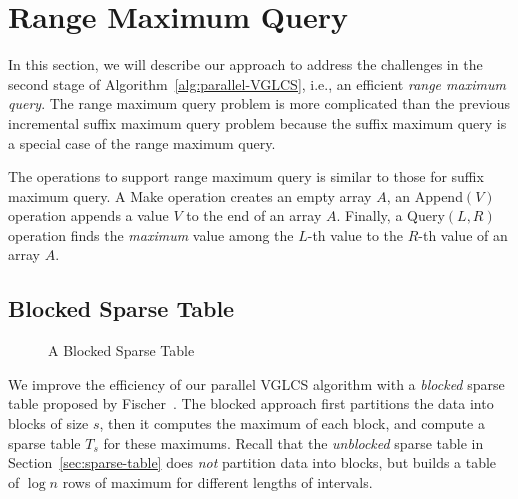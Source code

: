\section{Range Maximum Query} \label{sec:parallelRMQ}

In this section, we will describe our approach to address the
challenges in the second stage of Algorithm~\ref{alg:parallel-VGLCS},
i.e., an efficient {\em range maximum query}.  The range maximum query
problem is more complicated than the previous incremental suffix
maximum query problem because the suffix maximum query is a special
case of the range maximum query.

The operations to support range maximum query is similar to those for
suffix maximum query.  A {\sc Make} operation creates an empty array
$A$, an {\sc Append}$(V)$ operation appends a value $V$ to the end of an
array $A$.  Finally, a {\sc Query}$(L, R)$ operation finds the {\em
maximum} value among the $L$-th value to the $R$-th value of an array
$A$.


\subsection{Blocked Sparse Table} \label{sec:blocked-sparse-table}

\begin{figure}[!thb]
  \centering {} 
  \caption{A Blocked Sparse Table}
  \label{fig:block-interval-decomposition}
\end{figure}

We improve the efficiency of our parallel VGLCS algorithm with a {\em
  blocked} sparse table proposed by
Fischer~\cite{Fischer2006TheoreticalAP}.  The blocked approach first
partitions the data into blocks of size $s$, then it computes the
maximum of each block, and compute a sparse table $T_s$ for these
maximums.  Recall that the {\em unblocked} sparse table in
Section~\ref{sec:sparse-table} does {\em not} partition data into
blocks, but builds a table of $\log n$ rows of maximum for different
lengths of intervals.

